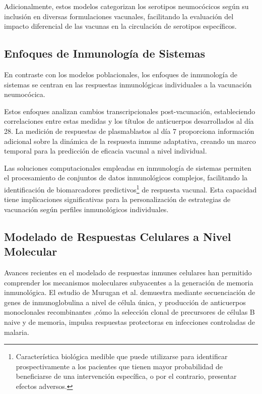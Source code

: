 Adicionalmente, estos modelos categorizan los serotipos neumocócicos según su inclusión en diversas formulaciones vacunales, facilitando la evaluación del impacto diferencial de las vacunas en la circulación de serotipos específicos. 

\subsection{Enfoques de Inmunología de Sistemas}

En contraste con los modelos poblacionales, los enfoques de inmunología de sistemas se centran en las respuestas inmunológicas individuales a la vacunación neumocócica\cite{Obermoser2013}. 

Estos enfoques analizan cambios transcripcionales post-vacunación, estableciendo correlaciones entre estas medidas y los títulos de anticuerpos desarrollados al día 28. La medición de respuestas de plasmablastos al día 7 proporciona información adicional sobre la dinámica de la respuesta inmune adaptativa, creando un marco temporal para la predicción de eficacia vacunal a nivel individual.

Las soluciones computacionales empleadas en inmunología de sistemas permiten el procesamiento de conjuntos de datos inmunológicos complejos, facilitando la identificación de biomarcadores predictivos\footnote{Característica biológica medible que puede utilizarse para identificar prospectivamente a los pacientes que tienen mayor probabilidad de beneficiarse de una intervención específica, o por el contrario, presentar efectos adversos.} de respuesta vacunal. Esta capacidad tiene implicaciones significativas para la personalización de estrategias de vacunación según perfiles inmunológicos individuales.

\subsection{Modelado de Respuestas Celulares a Nivel Molecular}

Avances recientes en el modelado de respuestas inmunes celulares han permitido comprender los mecanismos moleculares subyacentes a la generación de memoria inmunológica. El estudio de Murugan et al. \cite{Murugan2018} demuestra mediante secuenciación de genes de inmunoglobulina a nivel de célula única, y producción de anticuerpos monoclonales recombinantes ,cómo la selección clonal de precursores de células B naive y de memoria, impulsa respuestas protectoras en infecciones controladas de malaria.

